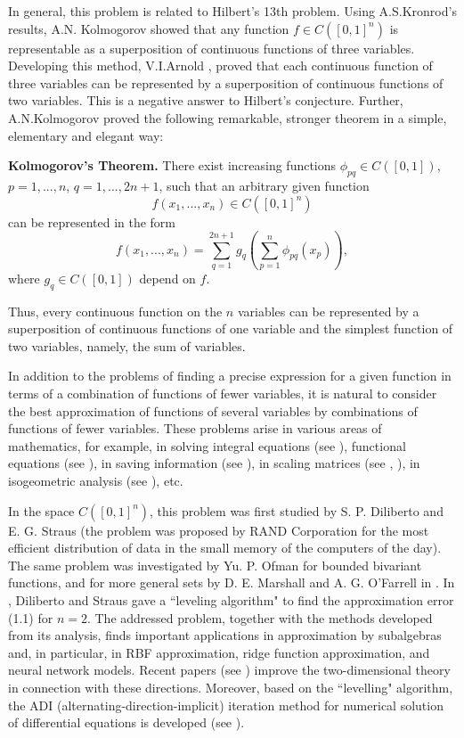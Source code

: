 \documentclass[12p]{article}
\numberwithin{equation}{section}
\begin{document}
In general, this problem is related to Hilbert's 13th problem. Using A.S.Kronrod's \cite{Kronrod} results, A.N. Kolmogorov \cite{Kolmogorov_1956} showed that any function $f \in C([0,1]^{n})$ is representable as a superposition of continuous functions of three variables. Developing this method, V.I.Arnold \cite{Arnold_1957}, \cite{Arnold_1959} proved that each continuous function of three variables can be represented by a superposition of continuous functions of two variables. This is a negative answer to Hilbert's conjecture. Further, A.N.Kolmogorov \cite{Kolmogorov_1957} proved the following remarkable, stronger theorem in a simple, elementary and elegant way:

	\textbf{Kolmogorov’s Theorem.} There exist increasing functions $\phi_{pq} \in C([0,1])$, $p=1,...,n$, $q=1,...,2n+1$, such that an arbitrary given function
\[f(x_1,...,x_n) \in C([0,1]^n) \]
can be represented in the form
\[f(x_1,...,x_n)=\sum_{q=1}^{2n+1}g_q \left(\sum_{p=1}^n \phi_{pq}(x_p)  \right),  \]
where $g_q \in C([0,1])$ depend on $f$.

Thus, every continuous function on the $n$ variables can be represented by a superposition of continuous functions of one variable and the simplest function of two variables, namely, the sum of variables.

In addition to the problems of finding a precise expression for a given function in terms of a combination of functions of fewer variables, it is natural to consider the best approximation of functions of several variables by combinations of functions of fewer variables. These problems arise in various areas of mathematics, for example, in solving integral equations (see \cite{Collatz}), functional equations (see \cite{Buck}), in saving information (see \cite{Diliberto_Straus}), in scaling matrices (see \cite{Golitschek_1980}, \cite{Golitschek_1982}), in isogeometric analysis (see \cite{Bosy}), etc. 

In the space $C([0,1]^n)$, this problem was first studied by S. P. Diliberto and E. G. Straus \cite{Diliberto_Straus} (the problem was proposed by RAND Corporation for the most efficient distribution of data in the small memory of the computers of the day). The same problem was investigated by Yu. P. Ofman \cite{Ofman} for bounded bivariant functions, and for more general sets by D. E. Marshall and A. G. O'Farrell in \cite{Marshall_Farrel}. In \cite{Diliberto_Straus}, Diliberto and Straus gave a “leveling algorithm" to find the approximation error (1.1) for \(n=2\). 
The addressed problem, together with the methods developed from its analysis, finds important applications in approximation by subalgebras and, in particular, in RBF approximation, ridge function approximation, and neural network models. Recent papers (see \cite{Akhmedov, Asgarova_2025, Asgarova_Huseynli, Asgarova_Maharov, Aysu}) improve the two-dimensional theory in connection with these directions. Moreover, based on the “levelling" algorithm, the ADI (alternating-direction-implicit) iteration method for numerical solution of differential equations is developed (see \cite{Tang, Wachspress_1994,Wachspress_2013}).
\end{document}
